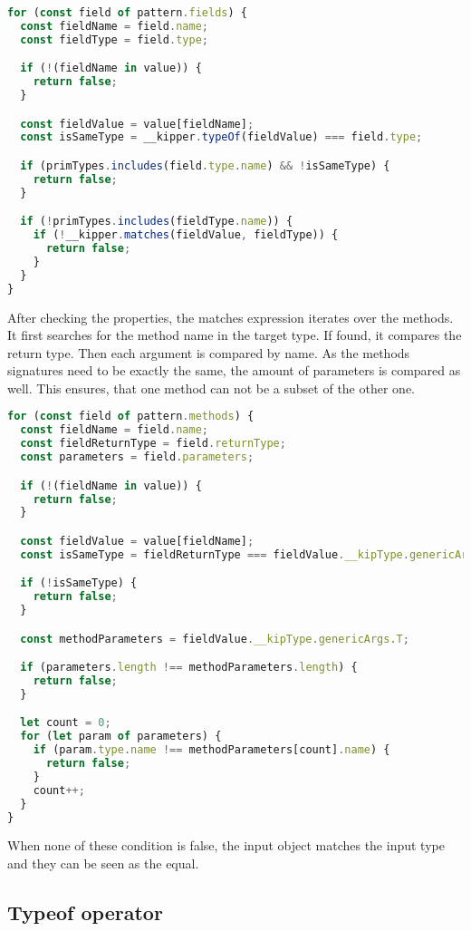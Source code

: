 \begin{lstlisting}[language=Typescript,caption=Matches operator property comparison,label=lst:implementation:matchesproperty]
for (const field of pattern.fields) {
  const fieldName = field.name;
  const fieldType = field.type;

  if (!(fieldName in value)) {
    return false;
  }

  const fieldValue = value[fieldName];
  const isSameType = __kipper.typeOf(fieldValue) === field.type;

  if (primTypes.includes(field.type.name) && !isSameType) {
    return false;
  }

  if (!primTypes.includes(fieldType.name)) {
    if (!__kipper.matches(fieldValue, fieldType)) {
      return false;
    }
  }
}
\end{lstlisting}

After checking the properties, the matches expression iterates over the methods. It first searches for the method name in the target type. If found, it compares the return type. Then each argument is compared by name. As the methods signatures need to be exactly the same, the amount of parameters is compared as well. This ensures, that one method can not be a subset of the other one.

\begin{lstlisting}[language=Typescript,caption=Matches operator method comparison,label=lst:implementation:matchesmethod]
for (const field of pattern.methods) {
  const fieldName = field.name;
  const fieldReturnType = field.returnType;
  const parameters = field.parameters;

  if (!(fieldName in value)) {
    return false;
  }

  const fieldValue = value[fieldName];
  const isSameType = fieldReturnType === fieldValue.__kipType.genericArgs.R;

  if (!isSameType) {
    return false;
  }

  const methodParameters = fieldValue.__kipType.genericArgs.T;

  if (parameters.length !== methodParameters.length) {
    return false;
  }

  let count = 0;
  for (let param of parameters) {
    if (param.type.name !== methodParameters[count].name) {
      return false;
    }
    count++;
  }
}
\end{lstlisting}

When none of these condition is false, the input object matches the input type and they can be seen as the equal.

\subsection{Typeof operator}
\label{subsec:typeof}


